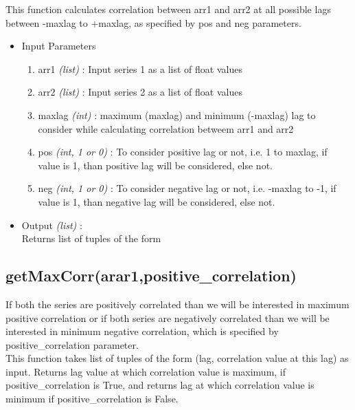 This function calculates correlation between arr1 and arr2 at all possible lags 
between -maxlag to +maxlag, as specified by pos and neg parameters.

\begin{itemize}
 \item Input Parameters
 
 \begin{enumerate}
  \item arr1 \textit{(list)} : Input series 1 as a list of float values
  \item arr2 \textit{(list)} : Input series 2 as a list of float values
  \item maxlag \textit{(int)} : maximum (maxlag) and minimum (-maxlag) lag to 
consider while calculating correlation betweem arr1 and arr2
  \item pos \textit{(int, 1 or 0)} : To consider positive lag or not, i.e. 1 to 
maxlag, if value is 1, than positive lag will be considered, else not.
  \item neg \textit{(int, 1 or 0)} : To consider negative lag or not, i.e. 
-maxlag to -1, if value is 1, than negative lag will be considered, else not.
 \end{enumerate}

 \item Output \textit{(list)} : \\
  Returns list of tuples of the form \\
 
\end{itemize}

\subsection{getMaxCorr(arar1,positive\_correlation)}

If both the series are positively correlated than we will be 
interested in maximum positive correlation or if both series are negatively 
correlated than we will be interested in minimum negative correlation, which is 
specified by positive\_correlation parameter.
\\
This function takes list of tuples of the form (lag, correlation value at this 
lag) as  input. Returns lag value at which correlation value is maximum, if 
positive\_correlation is True, and returns lag at which correlation value is 
minimum if positive\_correlation is False. \\




